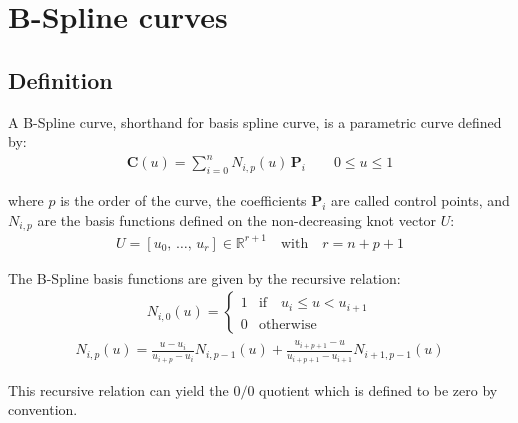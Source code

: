 \section{B-Spline curves}

\subsection{Definition}

A B-Spline curve, shorthand for basis spline curve, is a parametric curve defined by:
\begin{align}
    \label{eq:def_bspline_curve}
    \mathbf{C}(u)=\sum_{i=0}^{n} N_{i,p}(u)\, \mathbf{P}_{i} \quad \quad 0 \leq u \leq 1
\end{align}

where $p$ is the order of the curve, the coefficients $\mathbf{P}_{i}$ are called control points, and $N_{i,p}$ are the basis functions defined on the non-decreasing knot vector $U$:
\begin{align}
    U = [u_0,\, \dots,\, u_{r}] \in \mathds{R}^{r+1} \quad \text{with} \quad r = n + p + 1
\end{align}

The B-Spline basis functions are given by the recursive relation:
\begin{align}
    N_{i,0}(u) =  \begin{cases}
    1& \mathrm{if} \quad u_{i}\leq u<u_{i+1}\\
    0& \mathrm{otherwise}
    \end{cases}
\end{align}
\begin{align}
 N_{i,p}(u)= \frac {u-u_{i}}{u_{i+p}-u_{i}} N_{i,p-1}(u) + \frac {u_{i+p+1}-u}{u_{i+p+1}-u_{i+1}} N_{i+1,p-1}(u)
\end{align}

This recursive relation can yield the $0/0$ quotient which is defined to be zero by convention.



